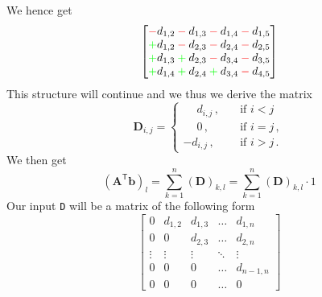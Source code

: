 \documentclass{article}
\begin{document}
We hence get
\begin{equation*}
    \begin{bmatrix}
        \color{red}-\color{black}d_{1,2} \color{red}-\color{black}d_{1,3} \color{red}-\color{black} d_{1,4} \color{red}-\color{black}d_{1,5}\\
        \color{green}+\color{black}d_{1,2} \color{red}-\color{black}d_{2,3} \color{red}-\color{black} d_{2,4} \color{red}-\color{black} d_{2,5}\\
        \color{green}+\color{black}d_{1,3} \color{green}+\color{black}d_{2,3} \color{red}-\color{black}d_{3,4} \color{red}-\color{black} d_{3,5} \\
        \color{green}+\color{black}d_{1,4} \color{green}+\color{black} d_{2,4} \color{green}+\color{black} d_{3,4} \color{red}-\color{black} d_{4,5}
    \end{bmatrix}
\end{equation*}
This structure will continue and we thus we derive the matrix
\begin{equation*}
    \mathbf{D}_{i,j} = \begin{cases}
        \phantom{-}d_{i,j}\,,\quad &\text{if } i < j\, \\
        \phantom{-}0\,, &\text{if } i = j\,, \\
        -d_{i,j}\,, &\text{if } i > j\,.
    \end{cases}
\end{equation*}
We then get
\begin{equation*}
    \left(\mathbf{A}^{\mathsf{T}}\mathbf{b}\right)_{l} = \sum_{k=1}^{n}\left(\mathbf{D}\right)_{k,l} = \sum_{k=1}^{n}\left(\mathbf{D}\right)_{k,l} \cdot 1
\end{equation*}
Our input \verb|D| will be a matrix of the following form
\begin{equation*}
    \begin{bmatrix}
        0 & d_{1,2} & d_{1,3} & \dots & d_{1,n} \\
        0 & 0 & d_{2,3} & \dots & d_{2,n} \\
        \vdots & \vdots & \vdots & \ddots& \vdots \\
        0 & 0 & 0 & \dots & d_{n-1, n} \\
        0 & 0 & 0 & \dots & 0
    \end{bmatrix}
\end{equation*}

\pagebreak 
\end{document}

